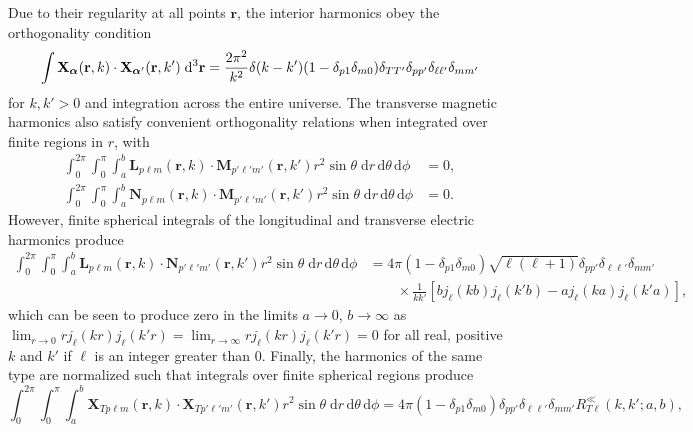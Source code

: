 Due to their regularity at all points $\mathbf{r}$, the interior harmonics obey the orthogonality condition
\begin{equation}\label{eq:vectorSphericalHarmonicOrthogonality}
\int \mathbf{X}_{\bm{\alpha}}(\mathbf{r},k)\cdot\mathbf{X}_{\bm{\alpha}'}(\mathbf{r},k')\;\mathrm{d}^3\mathbf{r} = \frac{2\pi^2}{k^2}\delta(k - k')(1 - \delta_{p1}\delta_{m0})\delta_{TT'}\delta_{pp'}\delta_{\ell\ell'}\delta_{mm'}\\
\end{equation}
for $k,k' > 0$ and integration across the entire universe. The transverse magnetic harmonics also satisfy convenient orthogonality relations when integrated over finite regions in $r$, with
\begin{equation}\label{eq:vectorSphericalHarmonicOrthogonalityConditionFinite}
\begin{split}
\int_0^{2\pi}\int_0^\pi\int_a^b\mathbf{L}_{p\ell m}(\mathbf{r},k)\cdot\mathbf{M}_{p'\ell'm'}(\mathbf{r},k')r^2\sin\theta\;\mathrm{d}r\,\mathrm{d}\theta\,\mathrm{d}\phi &= 0,\\
\int_0^{2\pi}\int_0^\pi\int_a^b\mathbf{N}_{p\ell m}(\mathbf{r},k)\cdot\mathbf{M}_{p'\ell'm'}(\mathbf{r},k')r^2\sin\theta\;\mathrm{d}r\,\mathrm{d}\theta\,\mathrm{d}\phi &= 0.
\end{split}
\end{equation}
However, finite spherical integrals of the longitudinal and transverse electric harmonics produce
\begin{equation}\label{eq:vectorSphericalHarmonicOrthogonalityConditionFiniteMixed}
\begin{split}
\int_0^{2\pi}\int_0^{\pi}\int_a^b\mathbf{L}_{p\ell m}(\mathbf{r},k)\cdot\mathbf{N}_{p'\ell'm'}(\mathbf{r},k')r^2\sin\theta\;\mathrm{d}r\,\mathrm{d}\theta\,\mathrm{d}\phi &= 4\pi(1 - \delta_{p1}\delta_{m0})\sqrt{\ell(\ell + 1)}\delta_{pp'}\delta_{\ell\ell'}\delta_{mm'}\\[-0.5em]
&\qquad\times\frac{1}{kk'}\left[bj_\ell(kb)j_\ell(k'b) - aj_\ell(ka)j_\ell(k'a)\right],
\end{split}
\end{equation}
which can be seen to produce zero in the limits $a\to0$, $b\to\infty$ as $\lim_{r\to0}rj_\ell(kr)j_\ell(k'r) = \lim_{r\to\infty}rj_\ell(kr)j_\ell(k'r) = 0$ for all real, positive $k$ and $k'$ if $\ell$ is an integer greater than 0. Finally, the harmonics of the same type are normalized such that integrals over finite spherical regions produce
\begin{equation}
\int_0^{2\pi}\int_0^\pi\int_a^b\mathbf{X}_{Tp\ell m}(\mathbf{r},k)\cdot\mathbf{X}_{Tp'\ell'm'}(\mathbf{r},k')r^2\sin\theta\;\mathrm{d}r\,\mathrm{d}\theta\,\mathrm{d}\phi = 4\pi(1 - \delta_{p1}\delta_{m0})\delta_{pp'}\delta_{\ell\ell'}\delta_{mm'}R_{T\ell}^{\ll}(k,k';a,b),
\end{equation}
